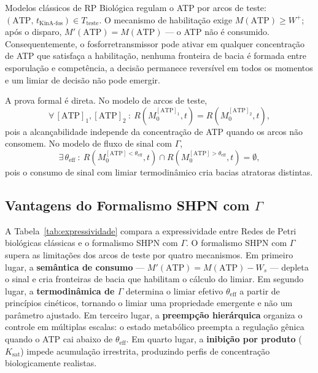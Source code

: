 Modelos clássicos de RP Biológica regulam o ATP por arcos de teste:
$(\text{ATP},\, t_{\text{KinA-fos}}) \in T_{\text{teste}}$.
O mecanismo de habilitação exige $M(\text{ATP}) \geq W^+$; após o disparo,
$M'(\text{ATP}) = M(\text{ATP})$ — o ATP não é consumido.
Consequentemente, o fosforretransmissor pode ativar em qualquer concentração de
ATP que satisfaça a habilitação, nenhuma fronteira de bacia é formada entre
esporulação e competência, a decisão permanece reversível em todos os momentos
e um limiar de decisão não pode emergir.

A prova formal é direta.
No modelo de arcos de teste,
\begin{equation}
\forall\, [\text{ATP}]_1, [\text{ATP}]_2\ :\ 
R(M_0^{[\text{ATP}]_1}, t) = R(M_0^{[\text{ATP}]_2}, t),
\end{equation}
pois a alcançabilidade independe da concentração de ATP quando os arcos não
consomem.
No modelo de fluxo de sinal com $\Gamma$,
\begin{equation}
\exists\, \theta_{\text{eff}}\ :\
R\!\left(M_0^{[\text{ATP}] < \theta_{\text{eff}}}, t\right) \cap
R\!\left(M_0^{[\text{ATP}] > \theta_{\text{eff}}}, t\right) = \emptyset,
\end{equation}
pois o consumo de sinal com limiar termodinâmico cria bacias atratoras
distintas.

\subsection{Vantagens do Formalismo SHPN com $\Gamma$}

A Tabela~\ref{tab:expressividade} compara a expressividade entre Redes de
Petri biológicas clássicas e o formalismo SHPN com $\Gamma$.
O formalismo SHPN com $\Gamma$ supera as limitações dos arcos de teste por
quatro mecanismos.
Em primeiro lugar, a \textbf{semântica de consumo} — $M'(\text{ATP}) =
M(\text{ATP}) - W_s$ — depleta o sinal e cria fronteiras de bacia que
habilitam o cálculo do limiar.
Em segundo lugar, a \textbf{termodinâmica de $\Gamma$} determina o limiar
efetivo $\theta_{\text{eff}}$ a partir de princípios cinéticos,
tornando o limiar uma propriedade emergente e não um parâmetro ajustado.
Em terceiro lugar, a \textbf{preempção hierárquica} organiza o controle em
múltiplas escalas: o estado metabólico preempta a regulação gênica quando o
ATP cai abaixo de $\theta_{\text{eff}}$.
Em quarto lugar, a \textbf{inibição por produto} ($K_{\text{sat}}$) impede
acumulação irrestrita, produzindo perfis de concentração biologicamente
realistas.

